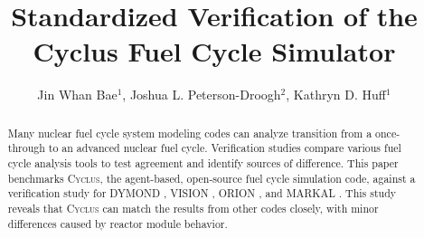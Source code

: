 \documentclass{elsarticle}
\newcommand{\Cyclus}{\textsc{Cyclus}\xspace}%
\begin{document}
\begin{frontmatter}

\title{Standardized Verification of the Cyclus Fuel Cycle Simulator}
\author{Jin Whan Bae$^{1}$, Joshua L. Peterson-Droogh$^{2}$, Kathryn D. Huff$^{1}$}
\address{$^{1}$Dept. of Nuclear, Plasma, and Radiological Engineering, University of Illinois at Urbana-Champaign, Urbana, IL \\ $^{2}$Oak Ridge National Laboratory, Oak Ridge, TN }

\begin{abstract}
Many nuclear fuel cycle system modeling codes
can analyze transition
from a once-through to an advanced nuclear
fuel cycle. Verification studies compare various
fuel cycle analysis tools to
test agreement and identify sources of difference.
This paper benchmarks \Cyclus, the agent-based,
open-source fuel cycle simulation code, against
a verification study \cite{feng_standardized_2016} for
DYMOND \cite{yacout_modeling_2005},
VISION \cite{jacobson_verifiable_2010},
ORION \cite{gregg_analysis_2012}, and
MARKAL \cite{shay_epa_2006}. This study reveals
that \Cyclus can match the results from other codes
closely, with minor differences caused by
reactor module behavior.
\end{abstract}

\end{frontmatter}

	









\end{document}
